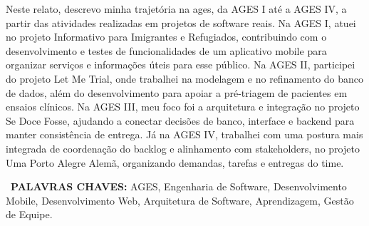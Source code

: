 \begin{resumo}

    Neste relato, descrevo minha trajetória na \ac{ages}, da AGES I até a AGES IV,
    a partir das atividades realizadas em projetos de software reais. Na AGES I,
    atuei no projeto Informativo para Imigrantes e Refugiados, contribuindo com o
    desenvolvimento e testes de funcionalidades de um aplicativo mobile para
    organizar serviços e informações úteis para esse público. Na AGES II,
    participei do projeto Let Me Trial, onde trabalhei na modelagem e no
    refinamento do banco de dados, além do desenvolvimento para apoiar a
    pré-triagem de pacientes em ensaios clínicos. Na AGES III, meu foco foi a
    arquitetura e integração no projeto Se Doce Fosse, ajudando a conectar
    decisões de banco, interface e backend para manter consistência de entrega. Já
    na AGES IV, trabalhei com uma postura mais integrada de coordenação do backlog
    e alinhamento com stakeholders, no projeto Uma Porto Alegre Alemã, organizando
    demandas, tarefas e entregas do time.

  \bigbreak\
  \textbf{PALAVRAS CHAVES:}
  AGES, Engenharia de Software, Desenvolvimento Mobile, Desenvolvimento Web,
  Arquitetura de Software, Aprendizagem, Gestão de Equipe.
\end{resumo}

